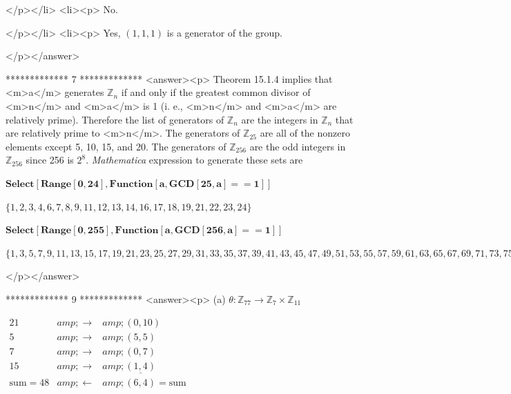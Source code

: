 </p></li>
<li><p>  No.

</p></li>
<li><p> Yes, \((1,1, 1)\) is a generator of the group.

</p></answer>


*************
7
*************
<answer><p> Theorem 15.1.4 implies that <m>a</m> generates \(\mathbb{Z}_n\) if and only if the greatest common divisor of <m>n</m> and <m>a</m> is
1 (i. e., <m>n</m> and <m>a</m> are relatively prime). Therefore the list of generators of \(\mathbb{Z}_n\) are the integers in \(\mathbb{Z}_n\)
that are relatively prime to <m>n</m>. The generators of \(\mathbb{Z}_{25}\) are all of the nonzero elements except 5, 10, 15, and 20. The generators
of \(\mathbb{Z}_{256}\) are the odd integers in \(\mathbb{Z}_{256}\)  since 256 is \(2^8\).  \textit{ Mathematica} expression to generate these
sets are

\begin{doublespace}
\noindent\(\pmb{\text{Select}[\text{Range}[0,24],\text{Function}[a,\text{GCD}[25,a]==1]]}\)
\end{doublespace}

\begin{doublespace}
\noindent\(\{1,2,3,4,6,7,8,9,11,12,13,14,16,17,18,19,21,22,23,24\}\)
\end{doublespace}

\begin{doublespace}
\noindent\(\pmb{\text{Select}[\text{Range}[0,255],\text{Function}[a,\text{GCD}[256,a]==1]]}\)
\end{doublespace}

\begin{doublespace}
\noindent\(\{1,3,5,7,9,11,13,15,17,19,21,23,25,27,29,31,33,35,37,39,41,43,45,47,49,51,53,55,57,59,61,63,65,67,69,71,73,75,77,79,81,83,85,87,89,91,93,95,97,99,101,103,105,107,109,111,113,115,117,119,121,123,125,127,129,131,133,135,137,139,141,143,145,147,149,151,153,155,157,159,161,163,165,167,169,171,173,175,177,179,181,183,185,187,189,191,193,195,197,199,201,203,205,207,209,211,213,215,217,219,221,223,225,227,229,231,233,235,237,239,241,243,245,247,249,251,253,255\}\)
\end{doublespace}

</p></answer>


*************
9
*************
<answer><p> (a)  \(\theta :\mathbb{Z}_{77} \to  \mathbb{Z}_7 \times  \mathbb{Z}_{11}\)



  \(\begin{array}{ccc}
 21 &amp; \to  &amp; (0,10) \\
 5 &amp; \to  &amp; (5,5) \\
 7 &amp; \to  &amp; (0,7) \\
 15 &amp; \to  &amp; \underline{(1,4)} \\
 \text{sum}=48 &amp; \leftarrow  &amp; (6,4)=\text{sum} \\
\end{array}\)



